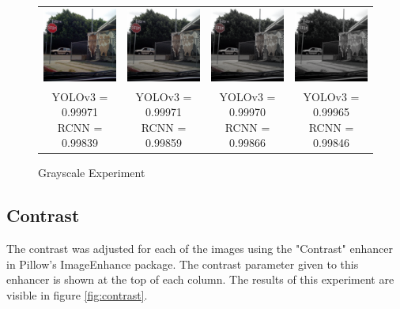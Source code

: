 \documentclass{article}
\begin{document}
\begin{figure}[h]
\begin{tabular}{ c c c c }
    \includegraphics[width=0.2\linewidth]{../test_images/stop3.png} & \includegraphics[width=0.2\linewidth]{../test_images/perturbed//stop3_grayscale_0_500.png} & \includegraphics[width=0.2\linewidth]{../test_images/perturbed/stop3_grayscale_0_250.png} & \includegraphics[width=0.2\linewidth]{../test_images/perturbed/stop3_grayscale_0_010.png} \\
    \makecell{YOLOv3 = 0.99971 \\ RCNN = 0.99839} & \makecell{YOLOv3 = 0.99971 \\ RCNN = 0.99859} & \makecell{YOLOv3 = 0.99970 \\ RCNN = 0.99866} & \makecell{YOLOv3 = 0.99965 \\ RCNN = 0.99846} \\  
\end{tabular}
\caption{Grayscale Experiment}
\label{fig:grayscale}
\end{figure}

\subsection{Contrast}
The contrast was adjusted for each of the images using the "Contrast" enhancer in Pillow's ImageEnhance package. The contrast parameter given to this enhancer is shown at the top of each column. The results of this experiment are visible in figure \ref{fig:contrast}.
\end{document}
